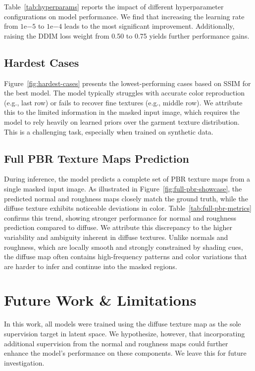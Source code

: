 \documentclass[11pt,twocolumn]{article}
\begin{document}
Table~\ref{tab:hyperparams} reports the impact of different hyperparameter configurations on model performance. 
We find that increasing the learning rate from $1\text{e}{-5}$ to $1\text{e}{-4}$ leads to the most significant improvement. 
Additionally, raising the DDIM loss weight from 0.50 to 0.75 yields further performance gains.

\subsection{Hardest Cases}

Figure~\ref{fig:hardest-cases} presents the lowest-performing cases based on SSIM for the 
best model. The model typically struggles with accurate color reproduction (e.g., last row) 
or fails to recover fine textures (e.g., middle row). We attribute this to the limited 
information in the masked input image, which requires the model to rely heavily on 
learned priors over the garment texture distribution. This is a challenging task, 
especially when trained on synthetic data.

\subsection{Full PBR Texture Maps Prediction}

During inference, the model predicts a complete set of PBR texture maps from a single masked input image. As illustrated in Figure~\ref{fig:full-pbr-showcase}, the predicted normal and roughness maps closely match the ground truth, while the diffuse texture exhibits noticeable deviations in color. Table~\ref{tab:full-pbr-metrics} confirms this trend, showing stronger performance for normal and roughness prediction compared to diffuse. We attribute this discrepancy to the higher variability and ambiguity inherent in diffuse textures. Unlike normals and roughness, which are locally smooth and strongly constrained by shading cues, the diffuse map often contains high-frequency patterns and color variations that are harder to infer and continue into the masked regions.

\section{Future Work \& Limitations}
In this work, all models were trained using the diffuse texture map as the sole supervision target in 
latent space. We hypothesize, however, that incorporating additional supervision from the normal and 
roughness maps could further enhance the model's performance on these components. 
We leave this for future investigation.
\end{document}
